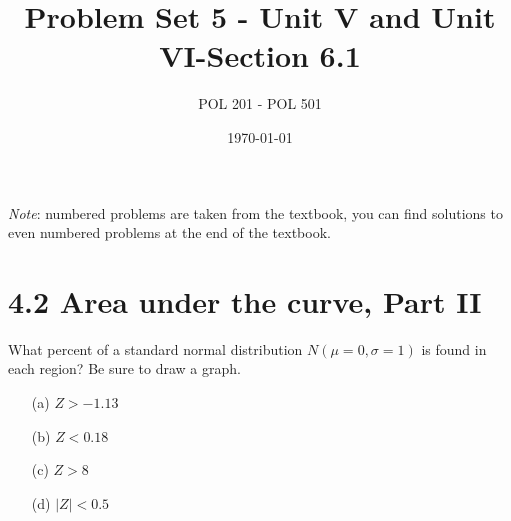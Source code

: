\documentclass{article}
\title{Problem Set 5 - Unit V and Unit VI-Section 6.1}
\author{POL 201 - POL 501}
\date{\today}
\begin{document}
\maketitle

\emph{Note}: numbered problems are taken from the textbook, you can find solutions to even numbered problems at the end of the textbook. 


\section*{4.2 Area under the curve, Part II}
What percent of a standard normal distribution \( N(\mu = 0, \sigma = 1) \) is found in each region? Be sure to draw a graph.
\begin{itemize}
    \item[(a)] \( Z > -1.13 \)
    \item[(b)] \( Z < 0.18 \)
    \item[(c)] \( Z > 8 \)
    \item[(d)] \( |Z| < 0.5 \)
\end{itemize}
\end{document}
